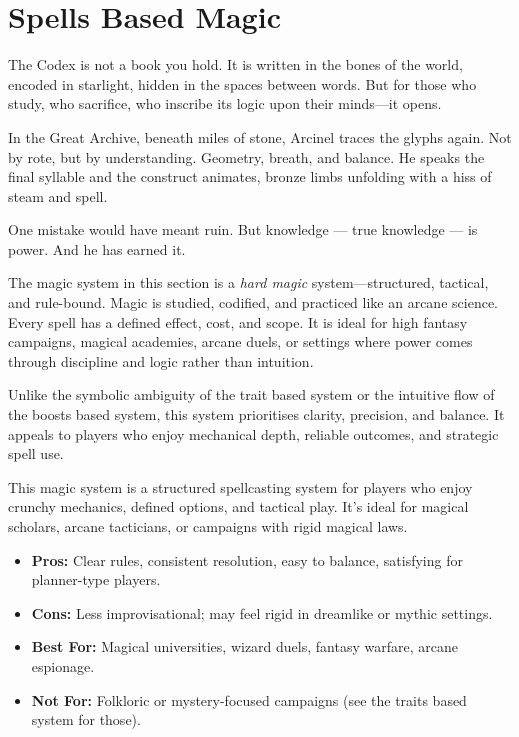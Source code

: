\section[Spells Based Magic]{Spells Based Magic}

\begin{Example}{}
    The Codex is not a book you hold. It is written in the bones of the world, encoded in starlight, hidden in the spaces between words. But for those who study, who sacrifice, who inscribe its logic upon their minds—it opens.

    In the Great Archive, beneath miles of stone, Arcinel traces the glyphs again. Not by rote, but by understanding. Geometry, breath, and balance. He speaks the final syllable and the construct animates, bronze limbs unfolding with a hiss of steam and spell.

    One mistake would have meant ruin. But knowledge — true knowledge — is power. And he has earned it.
\end{Example}

The magic system in this section is a \emph{hard magic} system—structured, tactical, and rule-bound. Magic is studied, codified, and practiced like an arcane science. Every spell has a defined effect, cost, and scope. It is ideal for high fantasy campaigns, magical academies, arcane duels, or settings where power comes through discipline and logic rather than intuition.

Unlike the symbolic ambiguity of the trait based system or the intuitive flow of the boosts based system, this system prioritises clarity, precision, and balance. It appeals to players who enjoy mechanical depth, reliable outcomes, and strategic spell use.

\begin{GmTips}
    This magic system is a structured spellcasting system for players who enjoy crunchy mechanics, defined options, and tactical play. It’s ideal for magical scholars, arcane tacticians, or campaigns with rigid magical laws.
    \begin{itemize}
        \item \textbf{Pros:} Clear rules, consistent resolution, easy to balance, satisfying for planner-type players.
        \item \textbf{Cons:} Less improvisational; may feel rigid in dreamlike or mythic settings.
        \item \textbf{Best For:} Magical universities, wizard duels, fantasy warfare, arcane espionage.
        \item \textbf{Not For:} Folkloric or mystery-focused campaigns (see the traits based system for those).
    \end{itemize}
\end{GmTips}

